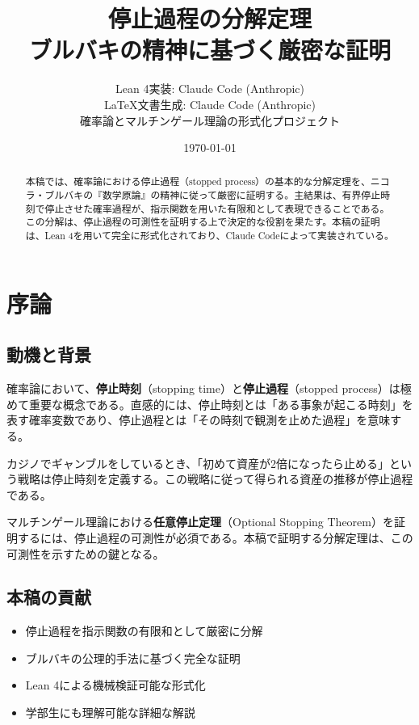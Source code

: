 \documentclass[a4paper,12pt]{ltjsarticle}
\title{停止過程の分解定理\\
{\large ブルバキの精神に基づく厳密な証明}}
\author{
  Lean 4実装: Claude Code (Anthropic)\\
  \LaTeX 文書生成: Claude Code (Anthropic)\\
  {\small 確率論とマルチンゲール理論の形式化プロジェクト}
}
\date{\today}
\theoremstyle{definition}
\begin{document}
\maketitle

\begin{abstract}
本稿では、確率論における停止過程（stopped process）の基本的な分解定理を、ニコラ・ブルバキの『数学原論』の精神に従って厳密に証明する。主結果は、有界停止時刻で停止させた確率過程が、指示関数を用いた有限和として表現できることである。この分解は、停止過程の可測性を証明する上で決定的な役割を果たす。本稿の証明は、Lean 4を用いて完全に形式化されており、Claude Codeによって実装されている。
\end{abstract}

\tableofcontents

\section{序論}

\subsection{動機と背景}

確率論において、\textbf{停止時刻}（stopping time）と\textbf{停止過程}（stopped process）は極めて重要な概念である。直感的には、停止時刻とは「ある事象が起こる時刻」を表す確率変数であり、停止過程とは「その時刻で観測を止めた過程」を意味する。

\begin{tcolorbox}[colback=blue!5!white,colframe=blue!75!black,title=例: カジノでの停止戦略]
カジノでギャンブルをしているとき、「初めて資産が2倍になったら止める」という戦略は停止時刻を定義する。この戦略に従って得られる資産の推移が停止過程である。
\end{tcolorbox}

マルチンゲール理論における\textbf{任意停止定理}（Optional Stopping Theorem）を証明するには、停止過程の可測性が必須である。本稿で証明する分解定理は、この可測性を示すための鍵となる。

\subsection{本稿の貢献}

\begin{itemize}
\item 停止過程を指示関数の有限和として厳密に分解
\item ブルバキの公理的手法に基づく完全な証明
\item Lean 4による機械検証可能な形式化
\item 学部生にも理解可能な詳細な解説
\end{itemize}
\end{document}
